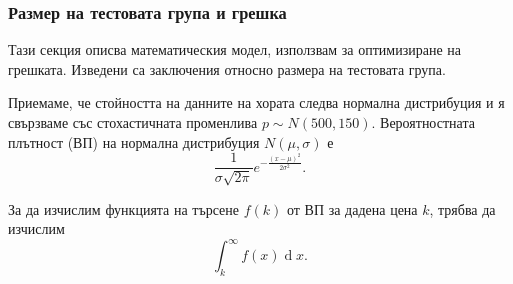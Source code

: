 \documentclass[11pt, a4paper]{article}
\theoremstyle{definition}
\begin{document}
			\subsubsection{Размер на тестовата група и грешка}
				Тази секция описва математическия модел, използвам за оптимизиране на грешката. Изведени са заключения относно размера на тестовата група.\par
				Приемаме, че стойността на данните на хората следва нормална дистрибуция и я свързваме със стохастичната променлива $p\sim N(500, 150)$. Вероятностната плътност (ВП) на нормална дистрибуция $N(\mu, \sigma)$ е $$\frac{1}{\sigma\sqrt{2\pi}}e^{-\frac{(x-\mu)^{2}}{2\sigma^{2}}}.$$\par\noindent
				За да изчислим функцията на търсене $f(k)$ от ВП за дадена цена $k$, трябва да изчислим
				$$\int_{k}^{\infty}f(x)\operatorname{d} x.$$
\end{document}
